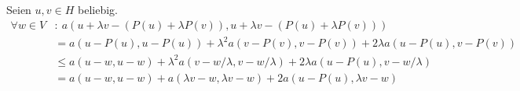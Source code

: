 \begin{solution}
\begin{itemize}
  Seien $u,v \in H$ beliebig.
  \begin{align*}
     \forall w \in V&:~a(u + \lambda v - (P(u) + \lambda P(v)),u + \lambda v - (P(u) + \lambda P(v))) \\
    &= a(u - P(u), u - P(u)) + \lambda^2a(v - P(v), v - P(v)) +
    2\lambda a(u - P(u), v - P(v))\\
    &\leq a(u - w, u - w) + \lambda^2a(v - w/\lambda, v - w/\lambda)
    + 2\lambda a(u - P(u), v - w/\lambda) \\
    &= a(u - w, u - w) + a(\lambda v - w, \lambda v - w)
    + 2 a(u - P(u),\lambda v - w)
  \end{align*}

\end{itemize}

\end{solution}


